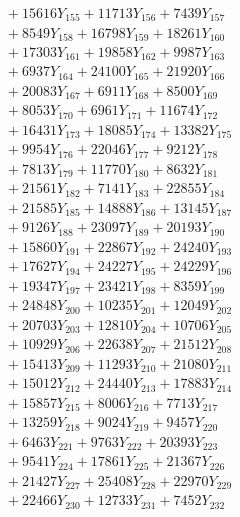 \documentclass[a4paper,10pt]{article}
\begin{document}
{\begin{align}
&\;  + 15616 Y_{155} + 11713 Y_{156} + 7439 Y_{157} \\[0.3ex]
&\;  + 8549 Y_{158} + 16798 Y_{159} + 18261 Y_{160} \\[0.3ex]
&\;  + 17303 Y_{161} + 19858 Y_{162} + 9987 Y_{163} \\[0.3ex]
&\;  + 6937 Y_{164} + 24100 Y_{165} + 21920 Y_{166} \\[0.3ex]
&\;  + 20083 Y_{167} + 6911 Y_{168} + 8500 Y_{169} \\[0.3ex]
&\;  + 8053 Y_{170} + 6961 Y_{171} + 11674 Y_{172} \\[0.3ex]
&\;  + 16431 Y_{173} + 18085 Y_{174} + 13382 Y_{175} \\[0.3ex]
&\;  + 9954 Y_{176} + 22046 Y_{177} + 9212 Y_{178} \\[0.5ex]\allowbreak
&\;  + 7813 Y_{179} + 11770 Y_{180} + 8632 Y_{181} \\[0.3ex]
&\;  + 21561 Y_{182} + 7141 Y_{183} + 22855 Y_{184} \\[0.3ex]
&\;  + 21585 Y_{185} + 14888 Y_{186} + 13145 Y_{187} \\[0.3ex]
&\;  + 9126 Y_{188} + 23097 Y_{189} + 20193 Y_{190} \\[0.3ex]
&\;  + 15860 Y_{191} + 22867 Y_{192} + 24240 Y_{193} \\[0.3ex]
&\;  + 17627 Y_{194} + 24227 Y_{195} + 24229 Y_{196} \\[0.3ex]
&\;  + 19347 Y_{197} + 23421 Y_{198} + 8359 Y_{199} \\[0.3ex]
&\;  + 24848 Y_{200} + 10235 Y_{201} + 12049 Y_{202} \\[0.3ex]
&\;  + 20703 Y_{203} + 12810 Y_{204} + 10706 Y_{205} \\[0.3ex]
&\;  + 10929 Y_{206} + 22638 Y_{207} + 21512 Y_{208} \\[0.5ex]\allowbreak
&\;  + 15413 Y_{209} + 11293 Y_{210} + 21080 Y_{211} \\[0.3ex]
&\;  + 15012 Y_{212} + 24440 Y_{213} + 17883 Y_{214} \\[0.3ex]
&\;  + 15857 Y_{215} + 8006 Y_{216} + 7713 Y_{217} \\[0.3ex]
&\;  + 13259 Y_{218} + 9024 Y_{219} + 9457 Y_{220} \\[0.3ex]
&\;  + 6463 Y_{221} + 9763 Y_{222} + 20393 Y_{223} \\[0.3ex]
&\;  + 9541 Y_{224} + 17861 Y_{225} + 21367 Y_{226} \\[0.3ex]
&\;  + 21427 Y_{227} + 25408 Y_{228} + 22970 Y_{229} \\[0.3ex]
&\;  + 22466 Y_{230} + 12733 Y_{231} + 7452 Y_{232} \\[0.3ex]

\end{align}}
\end{document}
